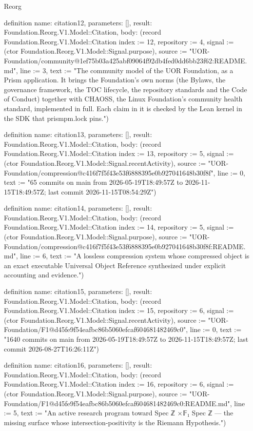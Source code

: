 \begin{lexlean}{Reorg}
\begin{semanticmodule}
definition{
  name: citation12,
  parameters: [],
  result: Foundation.Reorg.V1.Model::Citation,
  body: (record Foundation.Reorg.V1.Model::Citation {index := 12, repository := 4, signal := (ctor Foundation.Reorg.V1.Model::Signal.purpose), source := "UOR-Foundation/community@1ef75b03a425abf09064f92db4fed0dd6bb23f62:README.md", line := 3, text := "The community model of the UOR Foundation, as a Prism application. It brings the Foundation's own norms (the Bylaws, the governance framework, the TOC lifecycle, the repository standards and the Code of Conduct) together with CHAOSS, the Linux Foundation's community health standard, implemented in full. Each claim in it is checked by the Lean kernel in the SDK that prismpm.lock pins."})
}

definition{
  name: citation13,
  parameters: [],
  result: Foundation.Reorg.V1.Model::Citation,
  body: (record Foundation.Reorg.V1.Model::Citation {index := 13, repository := 5, signal := (ctor Foundation.Reorg.V1.Model::Signal.recentActivity), source := "UOR-Foundation/compression@c416f7f5f43e53f6888395e0b927041648b30f8f", line := 0, text := "65 commits on main from 2026-05-19T18:49:57Z to 2026-11-15T18:49:57Z; last commit 2026-11-15T08:54:29Z"})
}

definition{
  name: citation14,
  parameters: [],
  result: Foundation.Reorg.V1.Model::Citation,
  body: (record Foundation.Reorg.V1.Model::Citation {index := 14, repository := 5, signal := (ctor Foundation.Reorg.V1.Model::Signal.purpose), source := "UOR-Foundation/compression@c416f7f5f43e53f6888395e0b927041648b30f8f:README.md", line := 6, text := "A lossless compression system whose compressed object is an exact executable Universal Object Reference synthesized under explicit accounting and evidence."})
}

definition{
  name: citation15,
  parameters: [],
  result: Foundation.Reorg.V1.Model::Citation,
  body: (record Foundation.Reorg.V1.Model::Citation {index := 15, repository := 6, signal := (ctor Foundation.Reorg.V1.Model::Signal.recentActivity), source := "UOR-Foundation/F1@d45fe9f54eafbc86b5060efcaf604681482469c0", line := 0, text := "1640 commits on main from 2026-05-19T18:49:57Z to 2026-11-15T18:49:57Z; last commit 2026-08-27T16:26:11Z"})
}

definition{
  name: citation16,
  parameters: [],
  result: Foundation.Reorg.V1.Model::Citation,
  body: (record Foundation.Reorg.V1.Model::Citation {index := 16, repository := 6, signal := (ctor Foundation.Reorg.V1.Model::Signal.purpose), source := "UOR-Foundation/F1@d45fe9f54eafbc86b5060efcaf604681482469c0:README.md", line := 5, text := "An active research program toward Spec ℤ ×{𝔽₁} Spec ℤ — the missing surface whose intersection-positivity is the Riemann Hypothesis."})
}


\end{semanticmodule}
\end{lexlean}
